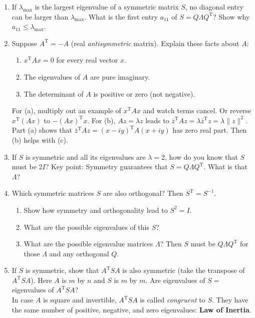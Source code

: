 \documentclass[14pt, a4paper]{article}
\begin{document}
\begin{enumerate}[resume]
    \item If $\lambda_{\max}$ is the largest eigenvalue of a symmetric matrix $S$, no diagonal entry can be larger than $\lambda_{\max}$. What is the first entry $a_{11}$ of $S = Q\Lambda Q^{\mathrm{T}}$? Show why $a_{11} \le \lambda_{\max}$.

    \item Suppose $A^{\mathrm{T}} = -A$ (real \textit{antisymmetric} matrix). Explain these facts about $A$:
          \begin{enumerate}
              \item $x^{\mathrm{T}}Ax = 0$ for every real vector $x$.
              \item The eigenvalues of $A$ are pure imaginary.
              \item The determinant of $A$ is positive or zero (not negative).
          \end{enumerate}
          For (a), multiply out an example of $x^{\mathrm{T}}Ax$ and watch terms cancel. Or reverse $x^{\mathrm{T}}(Ax)$ to $-(Ax)^{\mathrm{T}}x$. For (b), $Az = \lambda z$ leads to $\bar{z}^{\mathrm{T}}Az = \lambda \bar{z}^{\mathrm{T}}z = \lambda \|z\|^2$. Part (a) shows that $\bar{z}^{\mathrm{T}}Az = (x - iy)^{\mathrm{T}}A(x + iy)$ has zero real part. Then (b) helps with (c).

    \item If $S$ is symmetric and all its eigenvalues are $\lambda = 2$, how do you know that $S$ must be $2I$? Key point: Symmetry guarantees that $S = Q\Lambda Q^{\mathrm{T}}$. What is that $\Lambda$?

    \item Which symmetric matrices $S$ are also orthogonal? Then $S^{\mathrm{T}} = S^{-1}$.
          \begin{enumerate}
              \item Show how symmetry and orthogonality lead to $S^2 = I$.
              \item What are the possible eigenvalues of this $S$?
              \item What are the possible eigenvalue matrices $\Lambda$? Then $S$ must be $Q\Lambda Q^{\mathrm{T}}$ for those $\Lambda$ and any orthogonal $Q$.
          \end{enumerate}

    \item If $S$ is symmetric, show that $A^{\mathrm{T}}SA$ is also symmetric (take the transpose of $A^{\mathrm{T}}SA$). Here $A$ is $m$ by $n$ and $S$ is $m$ by $m$. Are eigenvalues of $S =$ eigenvalues of $A^{\mathrm{T}}SA$? \\
          In case $A$ is square and invertible, $A^{\mathrm{T}}SA$ is called \textit{congruent} to $S$. They have the same number of positive, negative, and zero eigenvalues: \textbf{Law of Inertia}.


\end{enumerate}
\end{document}
